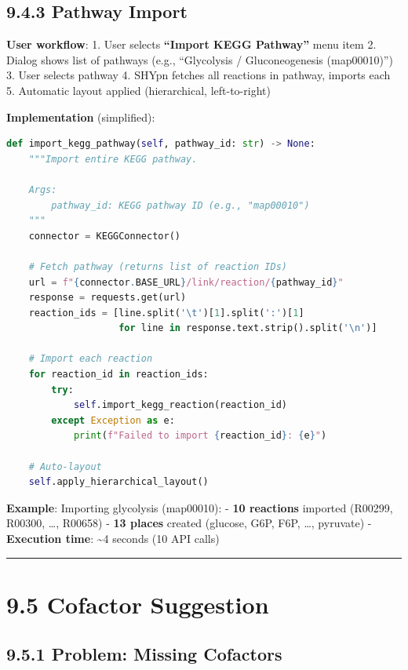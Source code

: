 \hypertarget{pathway-import}{%
\subsection{9.4.3 Pathway Import}\label{pathway-import}}

\textbf{User workflow}: 1. User selects \textbf{``Import KEGG Pathway''}
menu item 2. Dialog shows list of pathways (e.g., ``Glycolysis /
Gluconeogenesis (map00010)'') 3. User selects pathway 4. SHYpn fetches
all reactions in pathway, imports each 5. Automatic layout applied
(hierarchical, left-to-right)

\textbf{Implementation} (simplified):

\begin{lstlisting}[language=Python]
def import_kegg_pathway(self, pathway_id: str) -> None:
    """Import entire KEGG pathway.
    
    Args:
        pathway_id: KEGG pathway ID (e.g., "map00010")
    """
    connector = KEGGConnector()
    
    # Fetch pathway (returns list of reaction IDs)
    url = f"{connector.BASE_URL}/link/reaction/{pathway_id}"
    response = requests.get(url)
    reaction_ids = [line.split('\t')[1].split(':')[1] 
                    for line in response.text.strip().split('\n')]
    
    # Import each reaction
    for reaction_id in reaction_ids:
        try:
            self.import_kegg_reaction(reaction_id)
        except Exception as e:
            print(f"Failed to import {reaction_id}: {e}")
    
    # Auto-layout
    self.apply_hierarchical_layout()
\end{lstlisting}

\textbf{Example}: Importing glycolysis (map00010): - \textbf{10
reactions} imported (R00299, R00300, \ldots, R00658) - \textbf{13
places} created (glucose, G6P, F6P, \ldots, pyruvate) -
\textbf{Execution time}: \textasciitilde4 seconds (10 API calls)

\begin{center}\rule{0.5\linewidth}{0.5pt}\end{center}

\hypertarget{cofactor-suggestion}{%
\section{9.5 Cofactor Suggestion}\label{cofactor-suggestion}}

\hypertarget{problem-missing-cofactors}{%
\subsection{9.5.1 Problem: Missing
Cofactors}\label{problem-missing-cofactors}}

